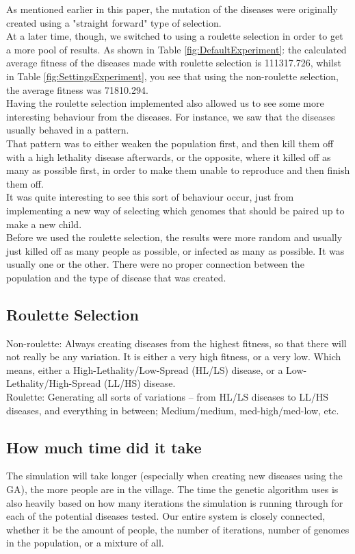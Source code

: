 \documentclass[conference,compsoc]{IEEEtran}
\begin{document}
As mentioned earlier in this paper, the mutation of the diseases were originally created using a "straight forward" type of selection.\\
At a later time, though, we switched to using a roulette selection in order to get a more pool of results. As shown in Table \ref{fig:DefaultExperiment}: the calculated average fitness of the diseases made with roulette selection is 111317.726, whilst in Table \ref{fig:SettingsExperiment}, you see that using the non-roulette selection, the average fitness was 71810.294.\\
Having the roulette selection implemented also allowed us to see some more interesting behaviour from the diseases. For instance, we saw that the diseases usually behaved in a pattern.\\
That pattern was to either weaken the population first, and then kill them off with a high lethality disease afterwards, or the opposite, where it killed off as many as possible first, in order to make them unable to reproduce and then finish them off.\\

It was quite interesting to see this sort of behaviour occur, just from implementing a new way of selecting which genomes that should be paired up to make a new child.\\ 
Before we used the roulette selection, the results were more random and usually just killed off as many people as possible, or infected as many as possible. It was usually one or the other. There were no proper connection between the population and the type of disease that was created.\\

\subsection{Roulette Selection}
Non-roulette: Always creating diseases from the highest fitness, so that there will not really be any variation. It is either a very high fitness, or a very low. Which means, either a High-Lethality/Low-Spread (HL/LS) disease, or a Low-Lethality/High-Spread (LL/HS) disease.\\

Roulette: Generating all sorts of variations – from HL/LS diseases to LL/HS diseases, and everything in between; Medium/medium, med-high/med-low, etc.\\

\subsection{How much time did it take}
The simulation will take longer (especially when creating new diseases using the GA), the more people are in the village. The time the genetic algorithm uses is also heavily based on how many iterations the simulation is running through for each of the potential diseases tested. Our entire system is closely connected, whether it be the amount of people, the number of iterations, number of genomes in the population, or a mixture of all.\\
\end{document}
